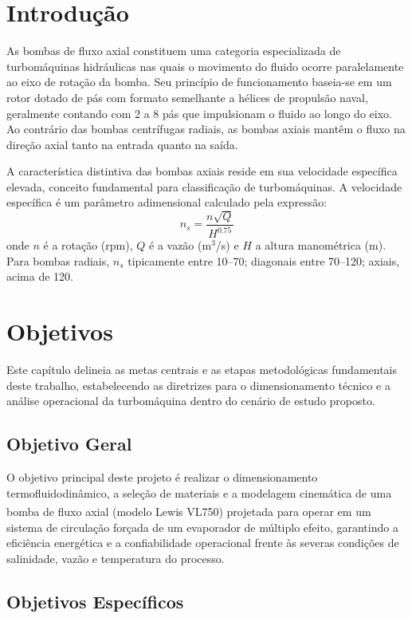 \section{Introdução}
\label{sec:introducao}
As bombas de fluxo axial constituem uma categoria especializada de turbomáquinas hidráulicas nas quais o movimento do fluido ocorre paralelamente ao eixo de rotação da bomba. Seu princípio de funcionamento baseia-se em um rotor dotado de pás com formato semelhante a hélices de propulsão naval, geralmente contando com 2 a 8 pás que impulsionam o fluido ao longo do eixo. Ao contrário das bombas centrífugas radiais, as bombas axiais mantêm o fluxo na direção axial tanto na entrada quanto na saída.

A característica distintiva das bombas axiais reside em sua velocidade específica elevada, conceito fundamental para classificação de turbomáquinas. A velocidade específica é um parâmetro adimensional calculado pela expressão:
\[
    n_s = \frac{n \sqrt{Q}}{H^{0.75}}
\]
onde $n$ é a rotação (rpm), $Q$ é a vazão (m$^3$/s) e $H$ a altura manométrica (m). Para bombas radiais, $n_s$ tipicamente entre 10--70; diagonais entre 70--120; axiais, acima de 120.


\section{Objetivos}
\label{sec:objetivos}

Este capítulo delineia as metas centrais e as etapas metodológicas fundamentais deste trabalho, estabelecendo as diretrizes para o dimensionamento técnico e a análise operacional da turbomáquina dentro do cenário de estudo proposto.

\subsection{Objetivo Geral}
\label{subsec:obj_geral}

O objetivo principal deste projeto é realizar o dimensionamento termofluidodinâmico, a seleção de materiais e a modelagem cinemática de uma bomba de fluxo axial (modelo Lewis\textsuperscript{\textregistered} VL750) projetada para operar em um sistema de circulação forçada de um evaporador de múltiplo efeito, garantindo a eficiência energética e a confiabilidade operacional frente às severas condições de salinidade, vazão e temperatura do processo.

\subsection{Objetivos Específicos}
\label{subsec:obj_esp}

